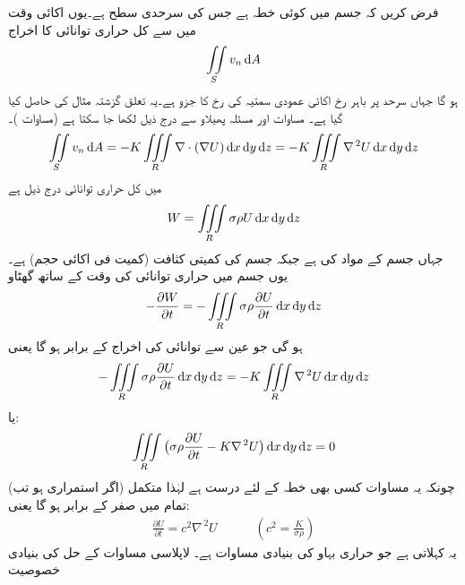 فرض کریں کہ جسم میں  کوئی خطہ ہے جس کی سرحدی سطح  ہے۔یوں اکائی وقت میں  سے کل حراری توانائی کا اخراج
\begin{align*}
\iint\limits_S v_n \dif A
\end{align*}
ہو گا جہاں  سرحد  پر باہر رخ اکائی عمودی سمتیہ  کی رخ   کا جزو ہے۔یہ تعلق گزشتہ مثال کی حاصل کیا گیا ہے۔ مساوات  اور مسئلہ پھیلاو سے درج ذیل لکھا جا سکتا ہے (مساوات )۔
\begin{align}
\iint\limits_S v_n \dif A=-K\iiint\limits_R \nabla \cdot (\nabla U)\dif x\dif y\dif z=-K\iiint\limits_R \nabla^{\,2}U \dif x\dif y\dif z
\end{align}
  میں کل حراری توانائی  درج ذیل ہے
\begin{align*}
W=\iiint\limits_R \sigma \rho U \dif x\dif y\dif z
\end{align*}
جہاں  جسم کے مواد کی  ہے جبکہ  جسم کی کمیتی کثافت (کمیت فی اکائی حجم) ہے۔یوں جسم میں حراری توانائی کی وقت کے ساتھ گھٹاو 
\begin{align*}
-\frac{\partial W}{\partial t}=-\iiint\limits_R \sigma \rho \frac{\partial U}{\partial t} \dif x\dif y\dif z
\end{align*}
ہو گی جو عین  سے توانائی کی اخراج کے برابر ہو گا یعنی
\begin{align*}
-\iiint\limits_R \sigma \rho \frac{\partial U}{\partial t} \dif x\dif y\dif z=-K\iiint\limits_R \nabla^{\,2}U \dif x\dif y\dif z
\end{align*} 
یا:
\begin{align*}
\iiint\limits_R \big(\sigma \rho\frac{\partial U}{\partial t}-K\nabla^{\,2}U\big)\dif x\dif y\dif z=0
\end{align*}
 چونکہ یہ مساوات کسی بھی خطہ  کے لئے درست ہے لہٰذا متکمل (اگر استمراری ہو تب) تمام  میں صفر کے برابر ہو گا یعنی:
\begin{align}
\frac{\partial U}{\partial t}=c^2\nabla^{\,2}U\quad \quad \quad (c^2=\frac{K}{\sigma \rho})
\end{align}
یہ  کہلاتی ہے جو حراری بہاو کی بنیادی مساوات ہے۔
\quad لاپلاسی مساوات کے حل کی بنیادی خصوصیت\\
